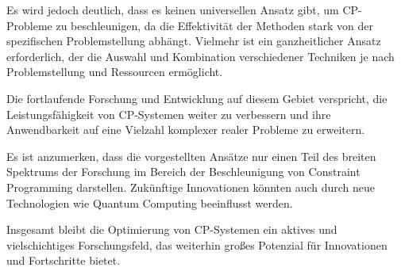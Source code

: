 Es wird jedoch deutlich, dass es keinen universellen Ansatz gibt, um CP-Probleme
zu beschleunigen, da die Effektivität der Methoden stark von der spezifischen
Problemstellung abhängt. Vielmehr ist ein ganzheitlicher Ansatz erforderlich,
der die Auswahl und Kombination verschiedener Techniken je nach Problemstellung
und Ressourcen ermöglicht.

Die fortlaufende Forschung und Entwicklung auf diesem Gebiet verspricht, die
Leistungsfähigkeit von CP-Systemen weiter zu verbessern und ihre Anwendbarkeit
auf eine Vielzahl komplexer realer Probleme zu erweitern.

Es ist anzumerken, dass die vorgestellten Ansätze nur einen Teil des breiten
Spektrums der Forschung im Bereich der Beschleunigung von Constraint Programming
darstellen. Zukünftige Innovationen könnten auch durch neue Technologien wie
Quantum Computing beeinflusst werden.

Insgesamt bleibt die Optimierung von CP-Systemen ein aktives und vielschichtiges
Forschungsfeld, das weiterhin großes Potenzial für Innovationen und Fortschritte
bietet.


\printbibliography[heading=bibintoc]






